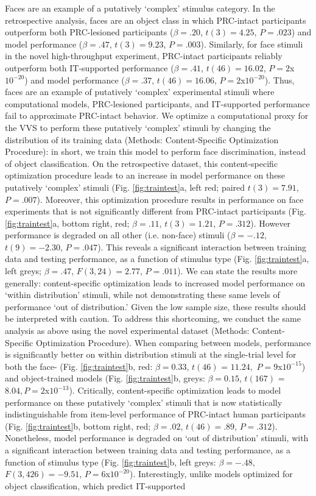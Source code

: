 \documentclass[11pt]{article}
\begin{document}
Faces are an example of a putatively `complex' stimulus category. In the retrospective analysis, faces are an object class in which PRC-intact participants outperform both PRC-lesioned participants ($\beta = .20$, $t(3) = 4.25$, $P = .023$) and model performance ($\beta = .47$, $t(3) = 9.23$, $P = .003$). Similarly, for face stimuli in the novel high-throughput experiment, PRC-intact participants reliably outperform both IT-supported performance ($\beta = .41$, $t(46) = 16.02$, $P = 2$x$10^{-20}$) and model performance ($\beta = .37$, $t(46) = 16.06$, $P = 2$x$10^{-20}$). Thus, faces are an example of putatively ‘complex’ experimental stimuli where computational models, PRC-lesioned participants, and IT-supported performance fail to approximate PRC-intact behavior. We optimize a computational proxy for the VVS to perform these putatively ‘complex’ stimuli by changing the distribution of its training data (Methods: Content-Specific Optimization Procedure): in short, we train this model to perform face discrimination, instead of object classification. On the retrospective dataset, this content-specific optimization procedure leads to an increase in model performance on these putatively `complex' stimuli (Fig. \ref{fig:traintest}a, left red; paired $t(3) = 7.91$, $P = .007$). Moreover, this optimization procedure results in performance on face experiments that is not significantly different from PRC-intact participants (Fig. \ref{fig:traintest}a, bottom right, red; $\beta = .11$, $t(3) = 1.21$, $P = .312$). However performance is degraded on all other (i.e. non-face) stimuli ($\beta = -.12$, $t(9) = -2.30$, $P = .047$). This reveals a significant interaction between training data and testing performance, as a function of stimulus type (Fig. \ref{fig:traintest}a, left greys; $\beta = .47$, $F(3,24) = 2.77$, $P = .011$). We can state the results more generally: content-specific optimization leads to increased model performance on ‘within distribution’ stimuli, while not demonstrating these same levels of performance `out of distribution.' Given the low sample size, these results should be interpreted with caution. To address this shortcoming, we conduct the same analysis as above using the novel experimental dataset (Methods: Content-Specific Optimization Procedure). When comparing between models, performance is significantly better on within distribution stimuli at the single-trial level for both the face- (Fig. \ref{fig:traintest}b, red: $\beta = 0.33$, $t(46)$ = $11.24,$ $P = 9$x$10 ^{-15}$) and object-trained models (Fig. \ref{fig:traintest}b, greys: $\beta = 0.15$, $t(167)$ = $8.04, P = 2$x$10 ^{-13}$). Critically, content-specific optimization leads to model performance on these putatively `complex' stimuli that is now statistically indistinguishable from item-level performance of PRC-intact human participants (Fig. \ref{fig:traintest}b, bottom right, red; $\beta = .02$, $t(46) = .89$, $P = .312$). Nonetheless, model performance is degraded on ‘out of distribution’ stimuli, with a significant interaction between training data and testing performance, as a function of stimulus type (Fig. \ref{fig:traintest}b, left greys: $\beta = -.48$, $F(3,426) = -9.51$, $P = 6$x$10^{-20}$). Interestingly, unlike models optimized for object classification, which predict IT-supported 
\end{document}
